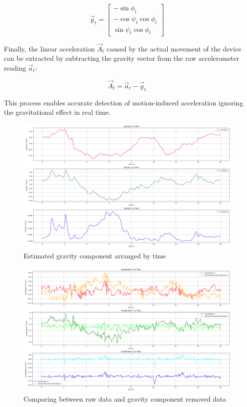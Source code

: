 \documentclass{article}
\begin{document}
\[
\vec{g}_t =
\begin{bmatrix}
-\sin\phi_t \\
-\cos\psi_t \cos\phi_t \\
\sin\psi_t \cos\phi_t
\end{bmatrix}
\]

Finally, the linear acceleration $\vec{A}_t$ caused by the actual movement of the device can be extracted by subtracting the gravity vector from the raw accelerometer reading $\vec{a}_t$:

\[
\vec{A}_t = \vec{a}_t - \vec{g}_t
\]

This process enables accurate detection of motion-induced acceleration ignoring the gravitational effect in real time.

\FloatBarrier
\begin{figure}[h]
    \centering
    \includegraphics[width=\textwidth]{2_1_5_1.png}
    \caption{Estimated gravity component arranged by time}
    \label{fig:gravity_component}
\end{figure}
\FloatBarrier
\begin{figure}[h]
    \centering
    \includegraphics[width=\textwidth]{2_1_5_2.png}
    \caption{Comparing between raw data and gravity component removed data}
    \label{fig:removal_of_gravity_component}
\end{figure}
\end{document}

